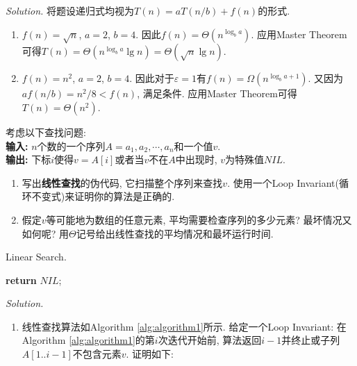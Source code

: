 \documentclass[10pt]{article}
\begin{document}
\begin{enumerate}
\begin{tcolorbox}
		\end{tcolorbox}
		\begin{tcolorbox}[colback=red!20!white]
			\textit{Solution.} 将题设递归式均视为$T(n)=aT(n/b)+f(n)$的形式. 
			\begin{enumerate}
				\item $f(n)=\sqrt{n}$, $a=2$, $b=4$. 因此$f(n)=\Theta(n^{\log_b a})$. 应用Master Theorem可得$T(n)=\Theta(n^{\log_b a}\lg n)=\Theta(\sqrt{n}\lg n)$.
				\item $f(n)=n^2$, $a=2$, $b=4$. 因此对于$\varepsilon=1$有$f(n)=\Omega(n^{\log_b a+1})$. 又因为$af(n/b)=n^2/8<f(n)$, 满足条件. 应用Master Theorem可得$T(n)=\Theta(n^2)$.
			\end{enumerate}
		\end{tcolorbox}
		\begin{algorithm}[h]
			\caption{Linear Search.}
			\label{alg:algorithm1}
			\BlankLine
			\textbf{return} $NIL$;
		\end{algorithm}
		\begin{tcolorbox}[colback=red!20!white, breakable]
			\textit{Solution.}\ 
			\begin{enumerate}
				\item 线性查找算法如Algorithm \ref{alg:algorithm1}所示. 给定一个Loop Invariant: 在Algorithm \ref{alg:algorithm1}的第$i$次迭代开始前, 算法返回$i-1$并终止或子列$A[1..i-1]$不包含元素$v$. 证明如下:\\

\end{enumerate}
\end{tcolorbox}
\end{enumerate}
\end{document}
